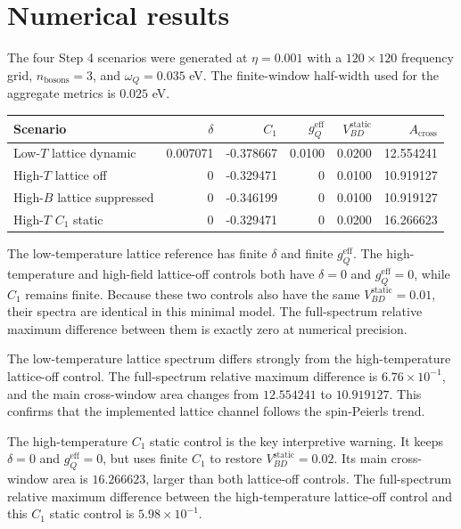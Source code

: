 \documentclass[11pt]{article}
\begin{document}
\section{Numerical results}
The four Step 4 scenarios were generated at $\eta=0.001$ with a
$120\times120$ frequency grid, $n_{\mathrm{bosons}}=3$, and
$\omega_Q=0.035$ eV.  The finite-window half-width used for the aggregate
metrics is $0.025$ eV.

\begin{center}
\begin{tabular}{lrrrrr}
\toprule
Scenario & $\delta$ & $C_1$ & $g_Q^{\mathrm{eff}}$ &
$V_{BD}^{\mathrm{static}}$ & $A_{\mathrm{cross}}$ \\
\midrule
Low-$T$ lattice dynamic & 0.007071 & -0.378667 & 0.0100 & 0.0200 & 12.554241 \\
High-$T$ lattice off & 0 & -0.329471 & 0 & 0.0100 & 10.919127 \\
High-$B$ lattice suppressed & 0 & -0.346199 & 0 & 0.0100 & 10.919127 \\
High-$T$ $C_1$ static & 0 & -0.329471 & 0 & 0.0200 & 16.266623 \\
\bottomrule
\end{tabular}
\end{center}

The low-temperature lattice reference has finite $\delta$ and finite
$g_Q^{\mathrm{eff}}$.  The high-temperature and high-field lattice-off controls
both have $\delta=0$ and $g_Q^{\mathrm{eff}}=0$, while $C_1$ remains finite.
Because these two controls also have the same $V_{BD}^{\mathrm{static}}=0.01$,
their spectra are identical in this minimal model.  The full-spectrum relative
maximum difference between them is exactly zero at numerical precision.

The low-temperature lattice spectrum differs strongly from the high-temperature
lattice-off control.  The full-spectrum relative maximum difference is
$6.76\times10^{-1}$, and the main cross-window area changes from $12.554241$ to
$10.919127$.  This confirms that the implemented lattice channel follows the
spin-Peierls trend.

The high-temperature $C_1$ static control is the key interpretive warning.  It
keeps $\delta=0$ and $g_Q^{\mathrm{eff}}=0$, but uses finite $C_1$ to restore
$V_{BD}^{\mathrm{static}}=0.02$.  Its main cross-window area is
$16.266623$, larger than both lattice-off controls.  The full-spectrum relative
maximum difference between the high-temperature lattice-off control and this
$C_1$ static control is $5.98\times10^{-1}$.
\end{document}
